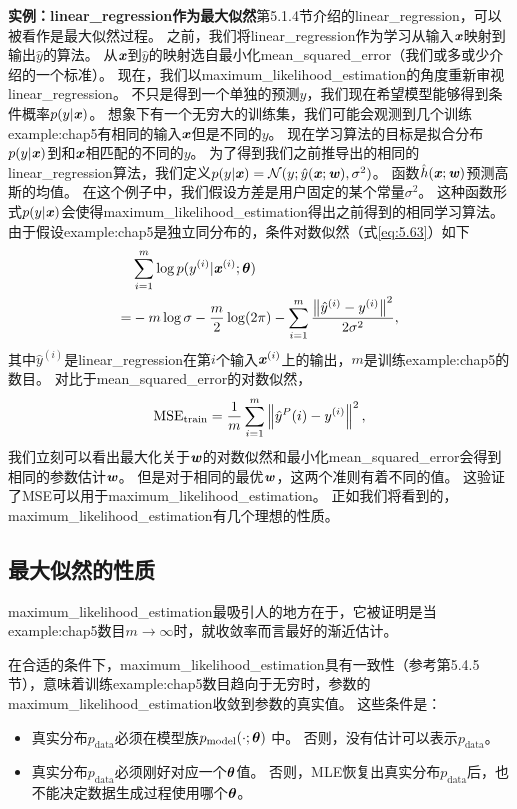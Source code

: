 
\textbf{实例：\gls{linear_regression}作为最大似然}\quad 第5.1.4节介绍的\gls{linear_regression}，可以被看作是最大似然过程。
之前，我们将\gls{linear_regression}作为学习从输入$\boldsymbol{\mathit{x}}$映射到输出$\hat{y}$的算法。
从$\boldsymbol{\mathit{x}}$到$\hat{y}$的映射选自最小化\gls{mean_squared_error}（我们或多或少介绍的一个标准）。
现在，我们以\gls{maximum_likelihood_estimation}的角度重新审视\gls{linear_regression}。
不只是得到一个单独的预测$\hat{y}$，我们现在希望模型能够得到条件概率$p(y|\boldsymbol{\mathit{x}})$。
想象下有一个无穷大的训练集，我们可能会观测到几个训练\gls{example:chap5}有相同的输入$\boldsymbol{\mathit{x}}$但是不同的$y$。
现在学习算法的目标是拟合分布$p(y | \boldsymbol{\mathit{x}})$到和$\boldsymbol{\mathit{x}}$相匹配的不同的$y$。
为了得到我们之前推导出的相同的\gls{linear_regression}算法，我们定义$p(y | \boldsymbol{\mathit{x}}) = \mathcal{N}(y; \hat{y}(\boldsymbol{\mathit{x}}; \boldsymbol{\mathit{w}}), \sigma^2)$。
函数$\hat{h}(\boldsymbol{\mathit{x}}; \boldsymbol{\mathit{w}})$预测高斯的均值。
在这个例子中，我们假设方差是用户固定的某个常量$\sigma^2$。
这种函数形式$p(y|\boldsymbol{\mathit{x}})$会使得\gls{maximum_likelihood_estimation}得出之前得到的相同学习算法。
由于假设\gls{example:chap5}是独立同分布的，条件对数似然（式\ref{eq:5.63}）如下
\begin{align}
     & \sum_{i=1}^m \log p(y^{(i)} | \boldsymbol{\mathit{x}}^{(i)}; \boldsymbol{\theta}) \\
    =& -m \log\sigma - \frac{m}{2} \log(2\pi) - \sum_{i=1}^m \frac{ \left\lVert\hat{y}^{(i)} - y^{(i)} \right\rVert^2 }{2\sigma^2},
\end{align}
其中$\hat{y}^{(i)}$是\gls{linear_regression}在第$i$个输入$\boldsymbol{\mathit{x}}^{(i)}$上的输出，$m$是训练\gls{example:chap5}的数目。
对比于\gls{mean_squared_error}的对数似然，
\begin{equation}
    \text{MSE}_{\text{train}} = \frac{1}{m} \sum_{i=1}^m \left\lVert\hat{y}^P{(i)} - y^{(i)}\right\rVert^2,
\end{equation}
我们立刻可以看出最大化关于$\boldsymbol{\mathit{w}}$的对数似然和最小化\gls{mean_squared_error}会得到相同的参数估计$\boldsymbol{\mathit{w}}$。
但是对于相同的最优$\boldsymbol{\mathit{w}}$，这两个准则有着不同的值。
这验证了MSE可以用于\gls{maximum_likelihood_estimation}。
正如我们将看到的，\gls{maximum_likelihood_estimation}有几个理想的性质。


\subsection{最大似然的性质}
\label{sec:properties_of_maximum_likelihood}
\gls{maximum_likelihood_estimation}最吸引人的地方在于，它被证明是当\gls{example:chap5}数目$m\to\infty$时，就收敛率而言最好的渐近估计。

在合适的条件下，\gls{maximum_likelihood_estimation}具有一致性（参考第5.4.5节），意味着训练\gls{example:chap5}数目趋向于无穷时，参数的\gls{maximum_likelihood_estimation}收敛到参数的真实值。
这些条件是：
\begin{itemize}
    \item 真实分布$p_{\text{data}}$必须在模型族$p_{\text{model}}(\cdot; \boldsymbol{\theta})$ 中。
    否则，没有估计可以表示$p_{\text{data}}$。
    
    \item 真实分布$p_{\text{data}}$必须刚好对应一个$\boldsymbol{\theta}$值。
    否则，\gls{MLE}恢复出真实分布$p_{\text{data}}$后，也不能决定数据生成过程使用哪个$\boldsymbol{\theta}$。
\end{itemize}

